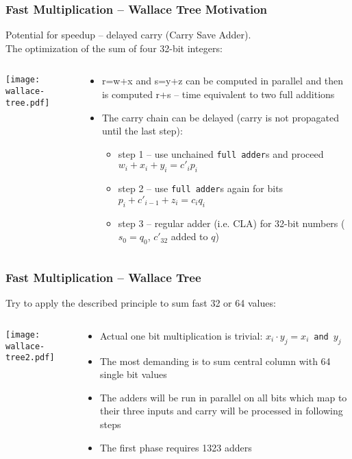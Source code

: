 \documentclass{beamer}
\begin{document}
\begin{frame}
\frametitle{Fast Multiplication -- Wallace Tree Motivation}

Potential for speedup -- delayed carry (Carry Save Adder).\\
The optimization of the sum of four 32-bit integers:\\
\begin{columns}
\begin{column}{0.35\textwidth}
\texttt{[image: wallace-tree.pdf]}
\end{column}
\hfill
\begin{column}{0.65\textwidth}
\begin{itemize}
\item r=w+x and s=y+z can be computed in parallel and then is computed r+s -- time equivalent to two full additions
\item The carry chain can be delayed (carry is not propagated until the last step):
\begin{itemize}
\item step 1 -- use unchained \texttt{full adder}s and proceed $w_i+x_i+y_i = c'_ip_i$
\item step 2 -- use \texttt{full adder}s again for bits $p_i+c'_{i-1}+z_i = c_iq_i$
\item step 3 -- regular adder (i.e. CLA) for 32-bit numbers ($s_0=q_0$, $c'_32$ added to $q$)
\end{itemize}
\end{itemize}
\end{column}
\end{columns}
\end{frame}


\begin{frame}
\frametitle{Fast Multiplication -- Wallace Tree}

Try to apply the described principle to sum fast 32 or 64 values:
\begin{columns}
\begin{column}{0.6\textwidth}
\texttt{[image: wallace-tree2.pdf]}
\end{column}
\hfill
\begin{column}{0.4\textwidth}
\begin{itemize}
\item Actual one bit multiplication is trivial: $x_i \cdot y_j=x_i$~\texttt{and}~$y_j$
\item The most demanding is to sum central column with 64 single bit values
\item The adders will be run in parallel on all bits which map to their three inputs and carry will be processed in following steps
\item The first phase requires 1323 adders
\end{itemize}
\end{column}
\end{columns}

\end{frame}
\end{document}
